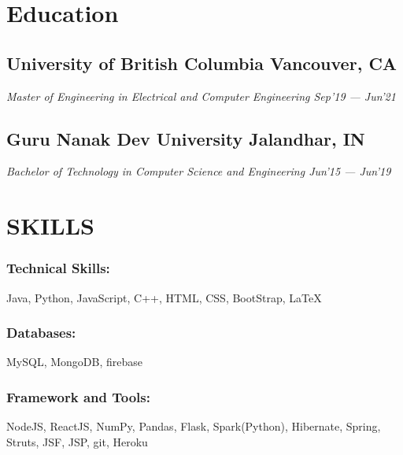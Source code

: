 \documentclass[a4paper,11pt]{article}
\begin{document}
\section{Education}
\subsection{University of British Columbia \hspace{23em}                   Vancouver, CA}
\emph{Master of Engineering in Electrical and Computer Engineering \hspace{13.3em}         Sep'19 --- Jun'21}
\vspace{0.8em}
\subsection{Guru Nanak Dev University   \hspace{24.2em}                        Jalandhar, IN}    
\emph{Bachelor of Technology in Computer Science and Engineering \hspace{13.7em}          Jun'15 ---  Jun'19}
\section{SKILLS}
\subsubsection{Technical Skills: }\hspace{0.4em}Java, Python, JavaScript, C++, HTML, CSS, BootStrap, {\LaTeX}
\subsubsection{Databases: }\hspace{0.4em}MySQL, MongoDB, firebase
\subsubsection{Framework and Tools: }\hspace{0.4em}NodeJS, ReactJS, NumPy, Pandas, Flask, Spark(Python), Hibernate, Spring, Struts, JSF, JSP, git, Heroku
\end{document}
